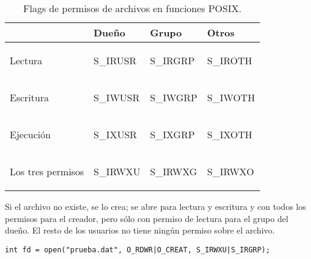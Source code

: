 \begin{table}
\centering
\begin{tabular}{l|l|l|l}
	& Dueño & Grupo & Otros \\
\hline
Lectura & 
\begin{codecell}
S_IRUSR
\end{codecell}
& 
\begin{codecell}
S_IRGRP
\end{codecell}
 & 
\begin{codecell}
S_IROTH
\end{codecell}
 \\
Escritura & 
\begin{codecell}
S_IWUSR
\end{codecell}
& 
\begin{codecell}
S_IWGRP
\end{codecell}
 & 
\begin{codecell}
S_IWOTH
\end{codecell}
 \\
Ejecución & 
\begin{codecell}
S_IXUSR
\end{codecell}
 & 
\begin{codecell}
S_IXGRP
\end{codecell}
 & 
\begin{codecell}
S_IXOTH
\end{codecell}
 \\
Los tres permisos & 
\begin{codecell}
S_IRWXU
\end{codecell}
 & 
\begin{codecell}
S_IRWXG 
\end{codecell}
& 
\begin{codecell}
S_IRWXO
\end{codecell}
\\
\end{tabular}
 \caption{Flags de permisos de archivos en funciones POSIX.}
 \label{tab:permisos} 
 \end{table} 



\begin{ejemplo}
Si el archivo  no existe, se lo crea; se abre para lectura y
escritura y con todos los permisos para el creador, pero sólo con permiso de
lectura para el grupo del dueño. El resto de los usuarios no tiene ningún
permiso sobre el archivo.
\begin{lstlisting}
int fd = open("prueba.dat", O_RDWR|O_CREAT, S_IRWXU|S_IRGRP);	
\end{lstlisting}
\end{ejemplo}


